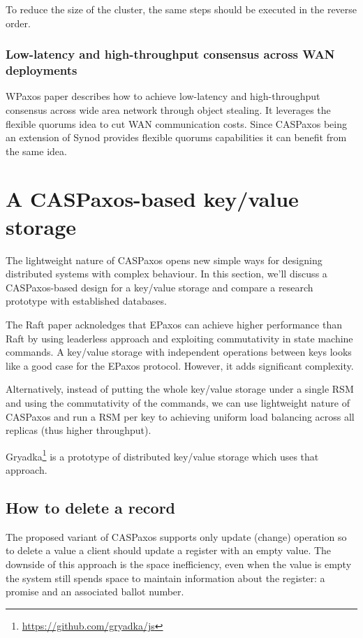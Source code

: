 \documentclass[12pt]{article}
\begin{document}
To reduce the size of the cluster, the same steps should be executed in the reverse order.

\subsubsection{Low-latency and high-throughput consensus across WAN deployments}

WPaxos\cite{wpaxos} paper describes how to achieve low-latency and high-throughput consensus across wide area network through object stealing. It leverages the flexible quorums\cite{fpaxos} idea to cut WAN communication costs. Since CASPaxos being an extension of Synod provides flexible quorums capabilities it can benefit from the same idea.

\section{A CASPaxos-based key/value storage}

The lightweight nature of CASPaxos opens new simple ways for designing distributed systems with complex behaviour. In this section, we'll discuss a CASPaxos-based design for a key/value storage and compare a research prototype with established databases.

The Raft paper acknoledges\cite{raft} that EPaxos\cite{epaxos} can achieve higher performance than Raft by using leaderless approach and exploiting commutativity in state machine commands. A key/value storage with independent operations between keys looks like a good case for the EPaxos protocol. However, it adds significant complexity.

Alternatively, instead of putting the whole key/value storage under a single RSM and using the commutativity of the commands, we can use lightweight nature of CASPaxos and run a RSM per key to achieving uniform load balancing across all replicas (thus higher throughput).

Gryadka\footnote{\href{https://github.com/gryadka/js}{https://github.com/gryadka/js}} is a prototype of distributed key/value storage which uses that approach.

\subsection{How to delete a record}

The proposed variant of CASPaxos supports only update (change) operation so to delete a value a client should update a register with an empty value. The downside of this approach is the space inefficiency, even when the value is empty the system still spends space to maintain information about the register: a promise and an associated ballot number.
\end{document}
